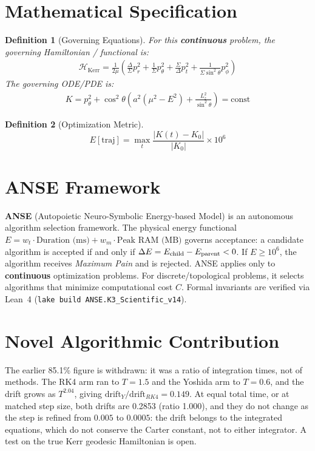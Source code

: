 \documentclass[11pt,a4paper]{article}
\newtheorem{definition}{Definition}
\begin{document}
\section{Mathematical Specification}
\begin{definition}[Governing Equations]
For this \textbf{continuous} problem, the governing Hamiltonian / functional is:
\begin{align}
\mathcal{H}_{\mathrm{Kerr}} = \frac{1}{2\mu}\left(\frac{\Delta}{\Sigma} p_r^2 + \frac{1}{\Sigma} p_\theta^2 + \frac{\Sigma}{\Delta} p_t^2 + \frac{1}{\Sigma \sin^2\!\theta} p_\phi^2\right)
\end{align}
The governing ODE/PDE is:
\begin{align}
K = p_\theta^2 + \cos^2\!\theta\!\left(a^2(\mu^2 - E^2) + \frac{L_z^2}{\sin^2\!\theta}\right) = \mathrm{const}
\end{align}
\end{definition}

\begin{definition}[Optimization Metric]
\[
E[\mathrm{traj}] = \max_{t} \frac{|K(t) - K_0|}{|K_0|} \times 10^6
\]
\end{definition}

\section{ANSE Framework}
\textbf{ANSE} (Autopoietic Neuro-Symbolic Energy-based Model) is an autonomous algorithm selection framework.
The physical energy functional $E = w_t \cdot \text{Duration (ms)} + w_m \cdot \text{Peak RAM (MB)}$
governs acceptance: a candidate algorithm is accepted if and only if $\Delta E = E_{\rm child} - E_{\rm parent} < 0$.
If $E \ge 10^6$, the algorithm receives \emph{Maximum Pain} and is rejected.
ANSE applies only to \textbf{continuous} optimization problems.
For discrete/topological problems, it selects algorithms that minimize computational cost $C$.
Formal invariants are verified via Lean~4 (\texttt{lake build ANSE.K3\_Scientific\_v14}).

\section{Novel Algorithmic Contribution}
The earlier 85.1\% figure is withdrawn: it was a ratio of integration times, not of methods. The RK4 arm ran to $T=1.5$ and the Yoshida arm to $T=0.6$, and the drift grows as $T^{2.04}$, giving $\text{drift}_Y/\text{drift}_{RK4}=0.149$. At equal total time, or at matched step size, both drifts are 0.2853 (ratio 1.000), and they do not change as the step is refined from $0.005$ to $0.0005$: the drift belongs to the integrated equations, which do not conserve the Carter constant, not to either integrator. A test on the true Kerr geodesic Hamiltonian is open.
\end{document}

